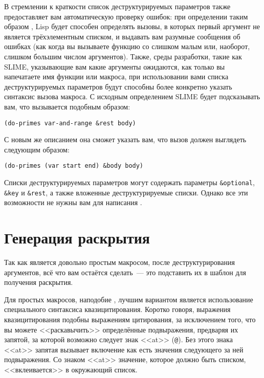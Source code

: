 В стремлении к краткости список деструктурируемых параметров также предоставляет вам
автоматическую проверку ошибок: при определении таким образом , Lisp будет
способен определять вызовы, в которых первый аргумент не является трёхэлементным списком,
и выдавать вам разумные сообщения об ошибках (как когда вы вызываете функцию со слишком
малым или, наоборот, слишком большим числом аргументов). Также, среды разработки, такие
как SLIME, указывающие вам какие аргументы ожидаются, как только вы напечатаете имя
функции или макроса, при использовании вами списка деструктурируемых параметров будут
способны более конкретно указать синтаксис вызова макроса. С исходным определением SLIME
будет подсказывать вам, что  вызывается подобным образом:

\begin{lstlisting}
(do-primes var-and-range &rest body)
\end{lstlisting}

С новым же описанием она сможет указать вам, что вызов должен выглядеть следующим образом:

\begin{lstlisting}
(do-primes (var start end) &body body)
\end{lstlisting}

Списки деструктурируемых параметров могут содержать параметры \lstinline!&optional!,
\lstinline!&key! и \lstinline!&rest!, а также вложенные деструктурируемые списки. Однако
все эти возможности не нужны вам для написания .

\section{Генерация раскрытия}

Так как  является довольно простым макросом, после деструктурирования
аргументов, всё что вам остаётся сделать~--- это подставить их в шаблон для получения
раскрытия.

Для простых макросов, наподобие , лучшим вариантом является использование
специального синтаксиса квазицитирования. Коротко говоря, выражения квазицитирования
подобны выражениям цитирования, за исключением того, что вы можете <<раскавычить>>
определённые подвыражения, предваряя их запятой, за которой возможно следует знак <<at>>
(\lstinline!@!). Без этого знака <<at>> запятая вызывает включение как есть значения
следующего за ней подвыражения. Со знаком <<at>> значение, которое должно быть списком,
<<вклеивается>> в окружающий список.

